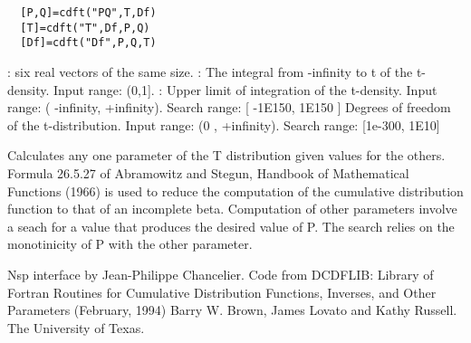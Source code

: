 \begin{mandesc}
\end{mandesc}
\label{cdft}
\begin{calling_sequence}
\begin{verbatim}
  [P,Q]=cdft("PQ",T,Df)  
  [T]=cdft("T",Df,P,Q)  
  [Df]=cdft("Df",P,Q,T)  
\end{verbatim}
\end{calling_sequence}
\begin{parameters}
  \begin{varlist}
     : six real vectors of the same size.
     : The integral from -infinity to t of the t-density. Input range: (0,1].
       : Upper limit of integration of the t-density. Input range: ( -infinity, +infinity). Search range: [ -1E150, 1E150 ]
       Degrees of freedom of the t-distribution. Input range: (0 , +infinity). Search range: [1e-300, 1E10]
  \end{varlist}
\end{parameters}
\begin{mandescription}
  Calculates any one parameter of the T distribution given
  values for the others.
  Formula  26.5.27  of   Abramowitz   and  Stegun,   Handbook   of
  Mathematical Functions  (1966) is used to reduce the computation
  of the cumulative distribution function to that of an incomplete
  beta.
  Computation of other parameters involve a seach for a value that
  produces  the desired  value  of P.   The search relies  on  the
  monotinicity of P with the other parameter.
\end{mandescription}

\begin{authors}
  Nsp interface by Jean-Philippe Chancelier. Code from DCDFLIB: 
  Library of Fortran Routines for Cumulative Distribution
  Functions, Inverses, and Other Parameters (February, 1994)
  Barry W. Brown, James Lovato and Kathy Russell. The University of Texas.
\end{authors}
